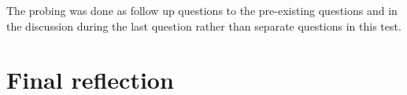 The probing was done as follow up questions to the pre-existing questions and in the discussion during the last question rather than separate questions in this test.



\section{Final reflection}

